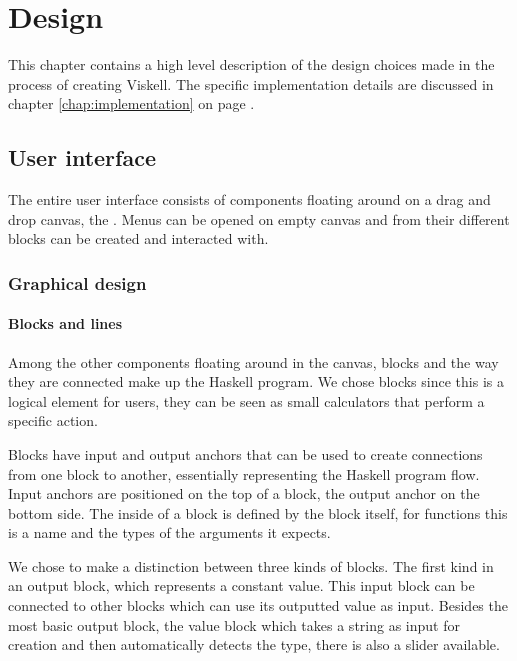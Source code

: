 \chapter{Design}

This chapter contains a high level description of the design choices made in the process of creating Viskell.
The specific implementation details are discussed in chapter \ref{chap:implementation} on page \pageref{chap:implementation}.

\section{User interface}

The entire user interface consists of components floating around on a drag and drop canvas, the . Menus can be opened on empty \gls{canvas} and from their different blocks can be created and interacted with.

\subsection{Graphical design}

\subsubsection{Blocks and lines}
Among the other components floating around in the canvas, blocks and the way they are connected make up the Haskell program. We chose blocks since this is a logical element for users, they can be seen as small calculators that perform a specific action.

Blocks have input and output anchors that can be used to create connections from one block to another, essentially representing the Haskell program flow. Input anchors are positioned on the top of a block, the output anchor on the bottom side. The inside of a block is defined by the block itself, for functions this is a name and the types of the arguments it expects.

We chose to make a distinction between three kinds of blocks.
The first kind in an output block, which represents a constant value.  
This input block can be connected to other blocks which can use its outputted value as input.
Besides the most basic output block, the value block which takes a string as input for creation and then automatically detects the type, there is also a slider available. 

